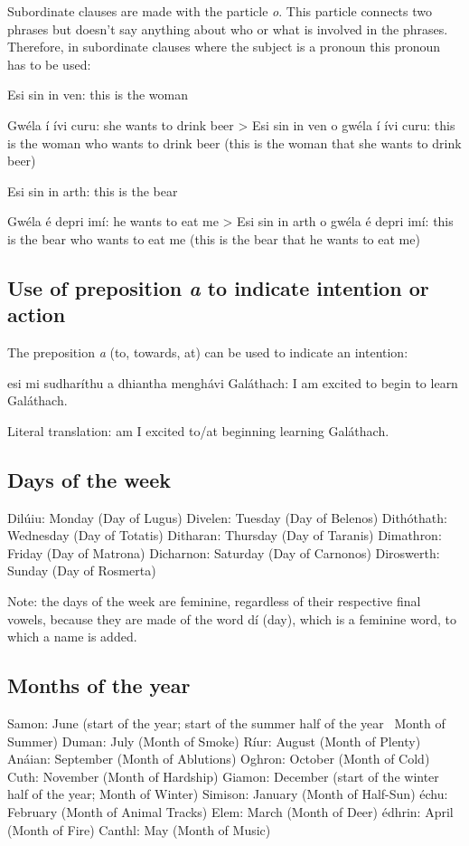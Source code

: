 Subordinate clauses are made with the particle \textit{o}. This particle connects two phrases but doesn't say anything about who or what is involved in the phrases. Therefore, in subordinate clauses where the subject is a pronoun this pronoun has to be used:

Esi sin in ven: this is the woman

Gw\'{e}la \'{i} \'{i}vi curu: she wants to drink beer
> Esi sin in ven o gw\'{e}la \'{i} \'{i}vi curu: this is the woman who wants to drink beer (this is the woman that she wants to drink beer)

Esi sin in arth: this is the bear

Gw\'{e}la \'{e} depri im\'{i}: he wants to eat me
> Esi sin in arth o gw\'{e}la \'{e} depri im\'{i}: this is the bear who wants to eat me (this is the bear that he wants to eat me)

\subsection{Use of preposition \textit{a} to indicate intention or action}

The preposition \textit{a} (to, towards, at) can be used to indicate an intention:

esi mi sudhar\'{i}thu a dhiantha mengh\'{a}vi Gal\'{a}thach: I am excited to begin to learn Gal\'{a}thach.

Literal translation: am I excited to/at beginning learning Gal\'{a}thach.

\subsection{Days of the week}

Dil\'{u}iu: Monday (Day of Lugus)
Divelen: Tuesday (Day of Belenos)
Dith\'{o}thath: Wednesday (Day of Totatis)
Ditharan: Thursday (Day of Taranis)
Dimathron: Friday (Day of Matrona)
Dicharnon: Saturday (Day of Carnonos)
Diroswerth: Sunday (Day of Rosmerta)

Note: the days of the week are feminine, regardless of their respective final vowels, because they are made of the word d\'{i} (day), which is a feminine word, to which a name is added.

\subsection{Months of the year}

Samon: June (start of the year; start of the summer half of the year \textendash\ Month of Summer)
Duman: July (Month of Smoke)
R\'{i}ur: August (Month of Plenty)
An\'{a}ian: September (Month of Ablutions)
Oghron: October (Month of Cold)
Cuth: November (Month of Hardship)
Giamon: December (start of the winter half of the year; Month of Winter)
Simison: January (Month of Half-Sun)
\'{e}chu: February (Month of Animal Tracks)
Elem: March (Month of Deer)
\'{e}dhrin: April (Month of Fire)
Canthl: May (Month of Music)

